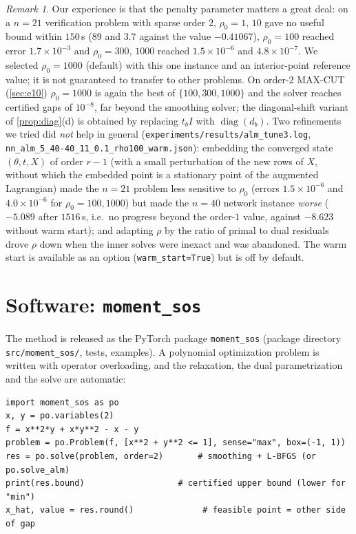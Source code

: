 \documentclass[a4paper,11pt]{article}
\theoremstyle{plain}
\theoremstyle{definition}
\theoremstyle{remark}
\newtheorem{remark}{Remark}
\newcommand{\diag}{\operatorname{diag}}
\begin{document}
\begin{remark}
Our experience is that the penalty parameter matters a great deal: on a $n=21$ verification problem with sparse order $2$, $\rho_0=1,\,10$ gave no useful bound within $150$\,s ($89$ and $3.7$ against the value $-0.41067$), $\rho_0=100$ reached error $1.7\times10^{-3}$ and $\rho_0=300,\,1000$ reached $1.5\times10^{-6}$ and $4.8\times10^{-7}$. We selected $\rho_0=1000$ (default) with this one instance and an interior-point reference value; it is not guaranteed to transfer to other problems. On order-$2$ MAX-CUT (\cref{sec:e10}) $\rho_0=1000$ is again the best of $\{100,300,1000\}$ and the solver reaches certified gaps of $10^{-8}$, far beyond the smoothing solver; the diagonal-shift variant of \cref{prop:diag}(d) is obtained by replacing $t_bI$ with $\diag(d_b)$. Two refinements we tried did \emph{not} help in general (\texttt{experiments/results/alm\_tune3.log}, \texttt{nn\_alm\_5\_40-40\_11\_0.1\_rho100\_warm.json}): embedding the converged state $(\theta,t,X)$ of order $r-1$ (with a small perturbation of the new rows of $X$, without which the embedded point is a stationary point of the augmented Lagrangian) made the $n=21$ problem less sensitive to $\rho_0$ (errors $1.5\times10^{-6}$ and $4.0\times10^{-6}$ for $\rho_0=100,1000$) but made the $n=40$ network instance \emph{worse} ($-5.089$ after $1516$\,s, i.e.\ no progress beyond the order-$1$ value, against $-8.623$ without warm start); and adapting $\rho$ by the ratio of primal to dual residuals drove $\rho$ down when the inner solves were inexact and was abandoned. The warm start is available as an option (\texttt{warm\_start=True}) but is off by default.
\end{remark}

\section{Software: \texttt{moment\_sos}}\label{sec:software}
The method is released as the PyTorch package \texttt{moment\_sos} (package directory \texttt{src/moment\_sos/}, tests, examples). A polynomial optimization problem is written with operator overloading, and the relaxation, the dual parametrization and the solve are automatic:
\begin{verbatim}
import moment_sos as po
x, y = po.variables(2)
f = x**2*y + x*y**2 - x - y
problem = po.Problem(f, [x**2 + y**2 <= 1], sense="max", box=(-1, 1))
res = po.solve(problem, order=2)       # smoothing + L-BFGS (or po.solve_alm)
print(res.bound)                   # certified upper bound (lower for "min")
x_hat, value = res.round()              # feasible point = other side of gap
\end{verbatim}
\end{document}
